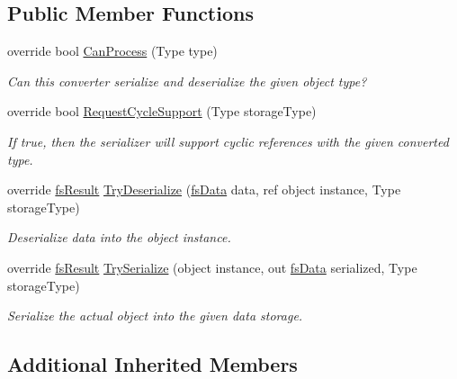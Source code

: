 \subsection*{Public Member Functions}
\begin{DoxyCompactItemize}
\item 
override bool \hyperlink{class_full_serializer_1_1_internal_1_1_converters_1_1_unity_event___converter_a98db577455b325edf5035170c6297474}{Can\+Process} (Type type)
\begin{DoxyCompactList}\small\item\em Can this converter serialize and deserialize the given object type? \end{DoxyCompactList}\item 
override bool \hyperlink{class_full_serializer_1_1_internal_1_1_converters_1_1_unity_event___converter_af4489bd5a993a32021e1ab24fcd6a42f}{Request\+Cycle\+Support} (Type storage\+Type)
\begin{DoxyCompactList}\small\item\em If true, then the serializer will support cyclic references with the given converted type. \end{DoxyCompactList}\item 
override \hyperlink{struct_full_serializer_1_1fs_result}{fs\+Result} \hyperlink{class_full_serializer_1_1_internal_1_1_converters_1_1_unity_event___converter_acad9c1e7e271c7ab3d0821c86fb12580}{Try\+Deserialize} (\hyperlink{class_full_serializer_1_1fs_data}{fs\+Data} data, ref object instance, Type storage\+Type)
\begin{DoxyCompactList}\small\item\em Deserialize data into the object instance. \end{DoxyCompactList}\item 
override \hyperlink{struct_full_serializer_1_1fs_result}{fs\+Result} \hyperlink{class_full_serializer_1_1_internal_1_1_converters_1_1_unity_event___converter_a9b91744cef0f028bfc7a0dbab226f3f8}{Try\+Serialize} (object instance, out \hyperlink{class_full_serializer_1_1fs_data}{fs\+Data} serialized, Type storage\+Type)
\begin{DoxyCompactList}\small\item\em Serialize the actual object into the given data storage. \end{DoxyCompactList}\end{DoxyCompactItemize}
\subsection*{Additional Inherited Members}


